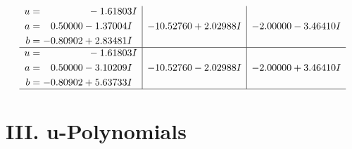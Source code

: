 \documentclass[1p]{elsarticle_modified}
\theoremstyle{definition}
\begin{document}
$$\begin{array}{c|c|c}
\begin{aligned}
u &= \phantom{-0.000000 } -1.61803 I \\
a &= \phantom{-}0.50000 - 1.37004 I \\
b &= -0.80902 + 2.83481 I\end{aligned}
 & -10.52760 + 2.02988 I & -2.00000 - 3.46410 I \\ \hline\begin{aligned}
u &= \phantom{-0.000000 } -1.61803 I \\
a &= \phantom{-}0.50000 - 3.10209 I \\
b &= -0.80902 + 5.63733 I\end{aligned}
 & -10.52760 - 2.02988 I & -2.00000 + 3.46410 I\\
 \hline 
 \end{array}$$\newpage
\newpage\renewcommand{\arraystretch}{1}
\centering \section*{ III. u-Polynomials}
\end{document}
